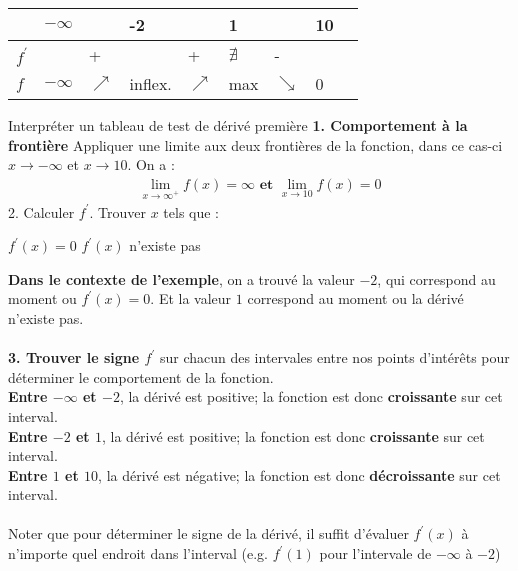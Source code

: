 \documentclass[2pt]{report}
\begin{document}
\begin{multicols*}{3}
\begin{table}[h]
      \begin{center}
        \renewcommand{\arraystretch}{1.5}
        \selectfont
        \footnotesize
        \begin{tabular}{|l|l|l|l|l|l|l|l|l}
        \arrayrulecolor{blue}\hline
        \rowcolor{lightBlue}
        \textcolor{myb}{} & \textcolor{myb}{ $-\infty$ } & & -2 & & 1 & & 10
        \\
        \hline
        \hline
        \arrayrulecolor{black} 
        $f^{\prime} $ &  & + &  & + & $\nexists$  & - & 
        \\ 
        \hline 
        $f$ & $-\infty$  & $\nearrow$ & inflex. & $\nearrow$ & max & $\searrow$ & 0 
        \\ 
        \hline
      \end{tabular}
    \end{center}
    \end{table}
\begin{EExample}{Interpréter un tableau de test de dérivé première}{}
  \textbf{1. Comportement à la frontière} 
  Appliquer une limite aux deux frontières de la fonction, dans ce cas-ci $x \rightarrow -\infty$ et 
  $x \rightarrow 10$. On a :
  \begin{align*}
    \lim\limits_{x\to\infty^{+}}f(x) = \infty  \textbf{ et }\lim\limits_{x\to 10}f(x) = 0        
  \end{align*}
  2. Calculer $f^{\prime}$. Trouver $x$ tels que :
  \begin{enumerate}
     $f^{\prime}\left(x\right) = 0$
   $f^{\prime}\left(x\right)$ n'existe pas  
  \end{enumerate}
  \textbf{Dans le contexte de l'exemple}, on a trouvé la valeur $-2$, qui correspond au moment ou 
  $f^{\prime}\left(x\right) = 0$. Et la valeur $1$ correspond au moment ou la dérivé n'existe pas. \\\\ 
  \textbf{3. Trouver le signe $f^{\prime}$} sur chacun des intervales entre nos points d'intérêts pour déterminer 
  le comportement de la fonction. \\ 
  \textbf{Entre $-\infty$ et $-2$}, la dérivé est positive; la fonction est donc \textbf{croissante} 
  sur cet interval. \\
  \textbf{Entre $-2$ et $1$}, la dérivé est positive; la fonction est donc \textbf{croissante} 
  sur cet interval. \\
  \textbf{Entre $1$ et $10$}, la dérivé est négative; la fonction est donc \textbf{décroissante} 
  sur cet interval. \\\\
Noter que pour déterminer le signe de la dérivé, il suffit d'évaluer $f^{\prime}\left(x\right)$ à n'importe 
quel endroit dans l'interval (e.g.  $f^{\prime}\left(1\right)$  pour l'intervale de $-\infty$ à $-2$)  
\end{EExample}




\end{multicols*}
\end{document}
